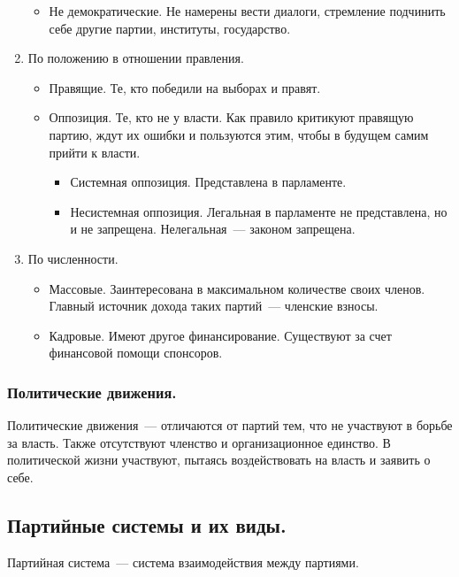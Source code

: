 \documentclass[12pt]{article}
\begin{document}
\begin{enumerate}
\begin{itemize}
			\item Не демократические. Не намерены вести диалоги, стремление подчинить себе другие партии, институты, государство.
		\end{itemize}
		\item По положению в отношении правления.
		\begin{itemize}
			\item Правящие. Те, кто победили на выборах и правят.
			\item Оппозиция. Те, кто не у власти. Как правило критикуют правящую партию, ждут их ошибки и пользуются этим, чтобы в будущем самим прийти к власти.
			\begin{itemize}
				\item Системная оппозиция. Представлена в парламенте.
				\item Несистемная оппозиция. Легальная в парламенте не представлена, но и не запрещена. Нелегальная~--- законом запрещена.
			\end{itemize}
		\end{itemize}
		\item По численности.
		\begin{itemize}
			\item Массовые. Заинтересована в максимальном количестве своих членов. Главный источник дохода таких партий~--- членские взносы.
			\item Кадровые. Имеют другое финансирование. Существуют за счет финансовой помощи спонсоров.
		\end{itemize}
	\end{enumerate}
	\subsubsection{Политические движения.}
	\begin{definition}
		Политические движения~--- отличаются от партий тем, что не участвуют в борьбе за власть. Также отсутствуют членство и организационное единство. В политической жизни участвуют, пытаясь воздействовать на власть и заявить о себе.
	\end{definition}
	\subsection{Партийные системы и их виды.}
	\begin{definition}
		Партийная система~--- система взаимодействия между партиями.
	\end{definition}
\end{document}
